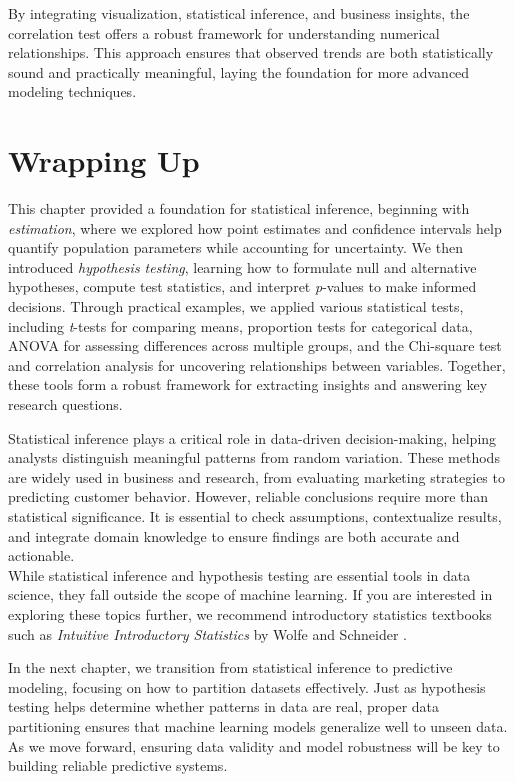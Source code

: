 \documentclass[
  11pt,
]{book}
\theoremstyle{definition}
\theoremstyle{definition}
\theoremstyle{definition}
\theoremstyle{definition}
\theoremstyle{remark}
\begin{document}
By integrating visualization, statistical inference, and business insights, the correlation test offers a robust framework for understanding numerical relationships. This approach ensures that observed trends are both statistically sound and practically meaningful, laying the foundation for more advanced modeling techniques.

\section{Wrapping Up}\label{wrapping-up}

This chapter provided a foundation for statistical inference, beginning with \emph{estimation}, where we explored how point estimates and confidence intervals help quantify population parameters while accounting for uncertainty. We then introduced \emph{hypothesis testing}, learning how to formulate null and alternative hypotheses, compute test statistics, and interpret \emph{p}-values to make informed decisions. Through practical examples, we applied various statistical tests, including \emph{t}-tests for comparing means, proportion tests for categorical data, ANOVA for assessing differences across multiple groups, and the Chi-square test and correlation analysis for uncovering relationships between variables. Together, these tools form a robust framework for extracting insights and answering key research questions.

Statistical inference plays a critical role in data-driven decision-making, helping analysts distinguish meaningful patterns from random variation. These methods are widely used in business and research, from evaluating marketing strategies to predicting customer behavior. However, reliable conclusions require more than statistical significance. It is essential to check assumptions, contextualize results, and integrate domain knowledge to ensure findings are both accurate and actionable.\\
While statistical inference and hypothesis testing are essential tools in data science, they fall outside the scope of machine learning. If you are interested in exploring these topics further, we recommend introductory statistics textbooks such as \emph{Intuitive Introductory Statistics} by Wolfe and Schneider \citep{wolfe2017intuitive}.

In the next chapter, we transition from statistical inference to predictive modeling, focusing on how to partition datasets effectively. Just as hypothesis testing helps determine whether patterns in data are real, proper data partitioning ensures that machine learning models generalize well to unseen data. As we move forward, ensuring data validity and model robustness will be key to building reliable predictive systems.
\end{document}
